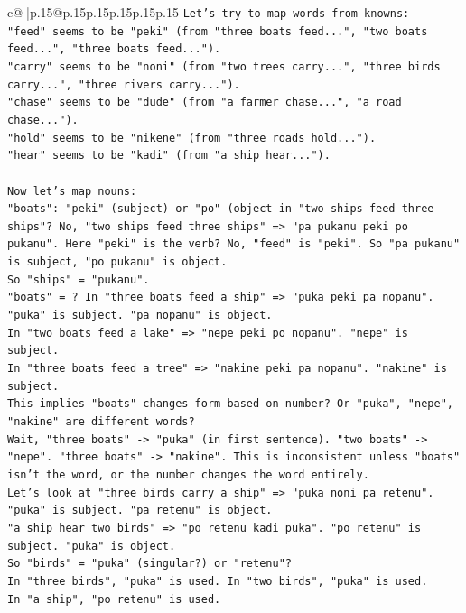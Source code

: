 \documentclass{article}
\begin{document}
{\begin{supertabular}{c@{$\;$}|p{.15\linewidth}@{}p{.15\linewidth}p{.15\linewidth}p{.15\linewidth}p{.15\linewidth}p{.15\linewidth}}
{{{\texttt{Let's try to map words from knowns:} \\
\texttt{"feed" seems to be "peki" (from "three boats feed...", "two boats feed...", "three boats feed...").} \\
\texttt{"carry" seems to be "noni" (from "two trees carry...", "three birds carry...", "three rivers carry...").} \\
\texttt{"chase" seems to be "dude" (from "a farmer chase...", "a road chase...").} \\
\texttt{"hold" seems to be "nikene" (from "three roads hold...").} \\
\texttt{"hear" seems to be "kadi" (from "a ship hear...").} \\
\\ 
\texttt{Now let's map nouns:} \\
\texttt{"boats": "peki" (subject) or "po" (object in "two ships feed three ships"? No, "two ships feed three ships" => "pa pukanu peki po pukanu". Here "peki" is the verb? No, "feed" is "peki". So "pa pukanu" is subject, "po pukanu" is object.} \\
\texttt{So "ships" = "pukanu".} \\
\texttt{"boats" = ? In "three boats feed a ship" => "puka peki pa nopanu". "puka" is subject. "pa nopanu" is object.} \\
\texttt{In "two boats feed a lake" => "nepe peki po nopanu". "nepe" is subject.} \\
\texttt{In "three boats feed a tree" => "nakine peki pa nopanu". "nakine" is subject.} \\
\texttt{This implies "boats" changes form based on number? Or "puka", "nepe", "nakine" are different words?} \\
\texttt{Wait, "three boats" {-}> "puka" (in first sentence). "two boats" {-}> "nepe". "three boats" {-}> "nakine". This is inconsistent unless "boats" isn't the word, or the number changes the word entirely.} \\
\texttt{Let's look at "three birds carry a ship" => "puka noni pa retenu". "puka" is subject. "pa retenu" is object.} \\
\texttt{"a ship hear two birds" => "po retenu kadi puka". "po retenu" is subject. "puka" is object.} \\
\texttt{So "birds" = "puka" (singular?) or "retenu"?} \\
\texttt{In "three birds", "puka" is used. In "two birds", "puka" is used.} \\
\texttt{In "a ship", "po retenu" is used.} \\
}}}
\end{supertabular}}
\end{document}
